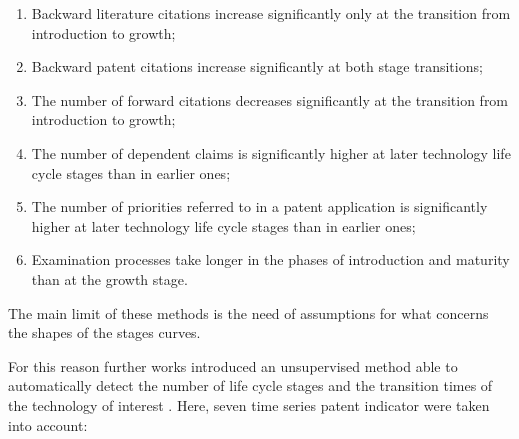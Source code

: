 \documentclass[b5paper,]{book}
\providecommand{\tightlist}{%
  \setlength{\itemsep}{0pt}\setlength{\parskip}{0pt}}
\theoremstyle{definition}
\theoremstyle{definition}
\theoremstyle{definition}
\theoremstyle{remark}
\begin{document}
\begin{enumerate}
\def\labelenumi{\arabic{enumi}.}
\tightlist
\item
  Backward literature citations increase significantly only at the
  transition from introduction to growth;
\item
  Backward patent citations increase significantly at both stage
  transitions;
\item
  The number of forward citations decreases significantly at the
  transition from introduction to growth;
\item
  The number of dependent claims is significantly higher at later
  technology life cycle stages than in earlier ones;
\item
  The number of priorities referred to in a patent application is
  significantly higher at later technology life cycle stages than in
  earlier ones;
\item
  Examination processes take longer in the phases of introduction and
  maturity than at the growth stage.
\end{enumerate}

The main limit of these methods is the need of assumptions for what
concerns the shapes of the stages curves.

For this reason further works introduced an unsupervised method able to
automatically detect the number of life cycle stages and the transition
times of the technology of interest \citep{lee2016stochastic}. Here,
seven time series patent indicator were taken into account:
\end{document}

